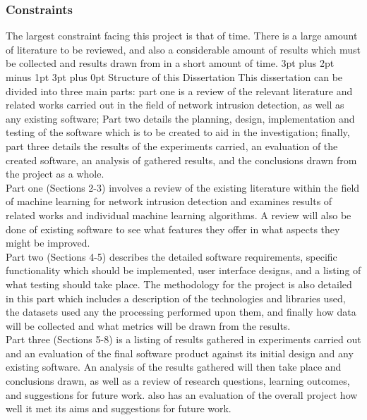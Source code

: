 \documentclass[12pt,a4paper]{article}
\makeatletter
\renewcommand\subsection{\@startsection {subsection}{1}{2mm} %
      {3pt plus 2pt minus 1pt} %
      {3pt plus 0pt} %
      {\normalfont\bfseries}}
\makeatother
\begin{document}
	\subsubsection{Constraints}
	The largest constraint facing this project is that of time. There is a large amount of literature to be reviewed, and also a considerable amount of results which must be collected and results drawn from in a short amount of time.
\subsection{Structure of this Dissertation}
This dissertation can be divided into three main parts: part one is a review of the relevant literature and related works carried out in the field of network intrusion detection, as well as any existing software; Part two details the planning, design, implementation and testing of the software which is to be created to aid in the investigation; finally, part three details the results of the experiments carried, an evaluation of the created software, an analysis of gathered results, and the conclusions drawn from the project as a whole. \\

Part one (Sections 2-3) involves a review of the existing literature within the field of machine learning for network intrusion detection and examines results of related works and individual machine learning algorithms. A review will also be done of existing software to see what features they offer in what aspects they might be improved. \\

Part two (Sections 4-5) describes the detailed software requirements, specific functionality which should be implemented, user interface designs, and a listing of what testing should take place. The methodology for the project is also detailed in this part which includes a description of the technologies and libraries used, the datasets used any the processing performed upon them, and finally how data will be collected and what metrics will be drawn from the results. \\

Part three (Sections 5-8) is a listing of results gathered in experiments carried out and an evaluation of the final software product against its initial design and any existing software. An analysis of the results gathered will then take place and conclusions drawn, as well as a review of research questions, learning outcomes, and suggestions for future work. also has an evaluation of the overall project how well it met its aims and suggestions for future work.
\end{document}
